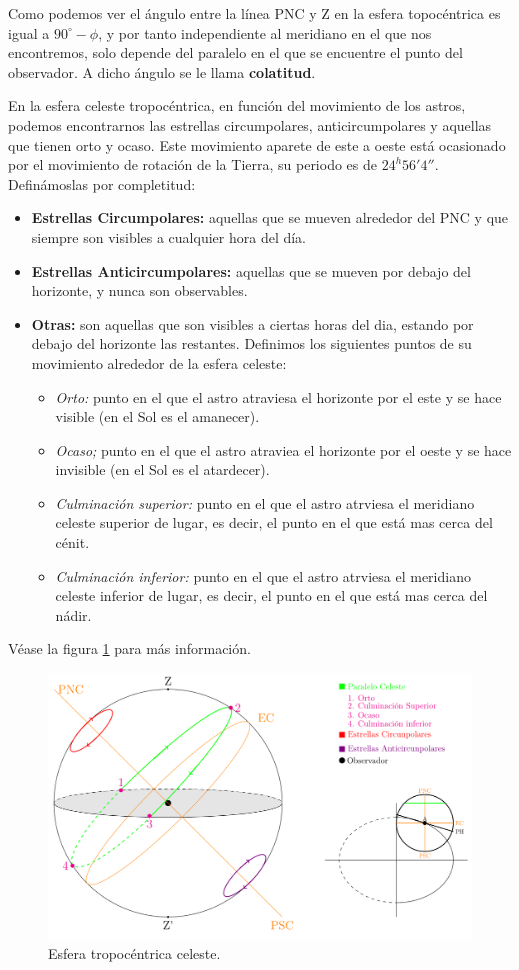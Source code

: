 Como podemos ver el ángulo entre la línea PNC y Z en la esfera topocéntrica es igual a $90^\circ - \phi$, y por tanto independiente al meridiano en el que nos encontremos, solo depende del paralelo en el que se encuentre el punto del observador. A dicho ángulo se le llama \textbf{colatitud}.

En la esfera celeste tropocéntrica, en función del movimiento de los astros, podemos encontrarnos las estrellas circumpolares, anticircumpolares y aquellas que tienen orto y ocaso. Este movimiento aparete de este a oeste está ocasionado por el movimiento de rotación de la Tierra, su periodo es de $24^h56'4''$. Definámoslas por completitud: 

\begin{itemize}
	\item \textbf{Estrellas Circumpolares:} aquellas que se mueven alrededor del PNC y que siempre son visibles a cualquier hora del día.
	\item \textbf{Estrellas Anticircumpolares:} aquellas que se mueven por debajo del horizonte, y nunca son observables. 
	\item \textbf{Otras:} son aquellas que son visibles a ciertas horas del dia, estando por debajo del horizonte las restantes. Definimos los siguientes puntos de su movimiento alrededor de la esfera celeste: 
	\begin{itemize}
		\item \textit{Orto:} punto en el que el astro atraviesa el horizonte por el este y se hace visible (en el Sol es el amanecer).
		\item \textit{Ocaso;} punto en el que el astro atraviea el horizonte por el oeste y se hace invisible (en el Sol es el atardecer).
		\item \textit{Culminación superior:} punto en el que el astro atrviesa el meridiano celeste superior de lugar, es decir, el punto en el que está mas cerca del cénit. 
		\item \textit{Culminación inferior:} punto en el que el astro atrviesa el meridiano celeste inferior de lugar, es decir, el punto en el que está mas cerca del nádir. 
	\end{itemize}
\end{itemize}
Véase la figura \ref{Fig:01-orto} para más información.


\begin{figure}[h!] \centering
	\includegraphics[width=0.6\linewidth]{Cuerpo/Ch_01/Culminacion.png}
	\caption{Esfera tropocéntrica celeste.}
	\label{Fig:01-orto}
\end{figure}

